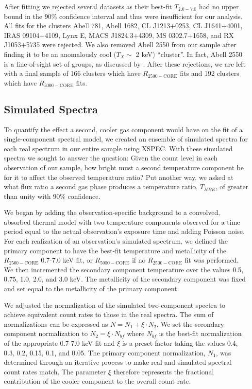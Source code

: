\documentclass[apj]{emulateapj}
\begin{document}
After fitting we rejected several datasets as their best-fit $T_{2.0-7.0}$
had no upper bound in the 90\% confidence interval and thus were
insufficient for our analysis. All fits for the clusters Abell 781,
Abell 1682, CL J1213+0253, CL J1641+4001, IRAS 09104+4109, Lynx E,
MACS J1824.3+4309, MS 0302.7+1658, and RX J1053+5735 were rejected. We
also removed Abell 2550 from our sample after finding it to be an
anomalously cool ($T_{X} \sim$ 2 keV) ``cluster''. In fact, Abell 2550
is a line-of-sight set of groups, as discussed by
\cite{2004cgpc.sympE..31M}. After these rejections, we are left with
a final sample of 166 clusters which have $R_{2500-\mathrm{CORE}}$
fits and 192 clusters which have $R_{5000-\mathrm{CORE}}$ fits.

\subsection{Simulated Spectra}\label{sec:simulated}

To quantify the effect a second, cooler gas component would have on
the fit of a single-component spectral model, we created an ensemble
of simulated spectra for each real spectrum in our entire sample using
{\textsc{XSPEC}}. With these simulated spectra we sought to answer the
question: Given the count level in each observation of our sample, how
bright must a second temperature component be for it to affect the
observed temperature ratio? Put another way, we asked at what flux
ratio a second gas phase produces a temperature ratio, $T_{HBR}$, of
greater than unity with 90\% confidence.

We began by adding the observation-specific background to a convolved,
absorbed thermal model with two temperature components observed for a
time period equal to the actual observation's exposure time and adding Poisson
noise. For each realization of an observation's simulated spectrum, we
defined the primary component to have the best-fit temperature and
metallicity of the $R_{2500-\mathrm{CORE}}$ 0.7-7.0 keV fit, or
$R_{5000-\mathrm{CORE}}$ if no $R_{2500-\mathrm{CORE}}$ fit was
performed. We then incremented the secondary component temperature
over the values 0.5, 0.75, 1.0, 2.0, and 3.0 keV. The metallicity of
the secondary component was fixed and set equal to the metallicity of
the primary component.

We adjusted the normalization of the simulated two-component spectra to
achieve equivalent count rates to those in the real spectra. The sum
of normalizations can be expressed as $N = N_1 + \xi \cdot N_2$. We
set the secondary component normalization to $N_2 = \xi \cdot N_{bf}$
where $N_{bf}$ is the best-fit normalization of the appropriate
0.7-7.0 keV fit and $\xi$ is a preset factor taking the values 0.4,
0.3, 0.2, 0.15, 0.1, and 0.05. The primary component normalization,
$N_1$, was determined through an iterative process to make real and
simulated spectral count rates match. The parameter $\xi$ therefore
represents the fractional contribution of the cooler component to the
overall count rate.
\end{document}
